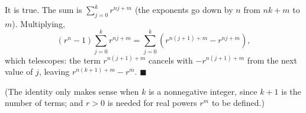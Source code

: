 It is true. The sum is $\displaystyle\sum_{j=0}^{k}r^{nj+m}$ (the exponents go down by $n$ from $nk+m$ to $m$). Multiplying,
\[\left(r^n-1\right)\sum_{j=0}^{k}r^{nj+m}=\sum_{j=0}^{k}\left(r^{n(j+1)+m}-r^{nj+m}\right),\]
which telescopes: the term $r^{n(j+1)+m}$ cancels with $-r^{n(j+1)+m}$ from the next value of $j$, leaving $r^{n(k+1)+m}-r^m$. $\blacksquare$

(The identity only makes sense when $k$ is a nonnegative integer, since $k+1$ is the number of terms; and $r>0$ is needed for real powers $r^{m}$ to be defined.)
